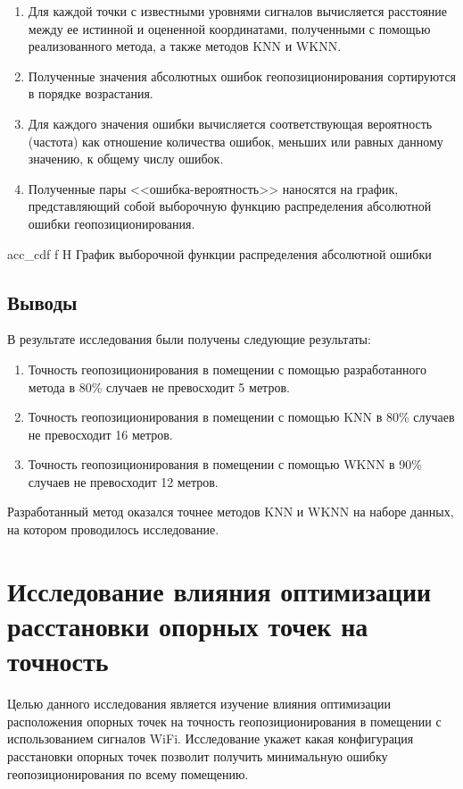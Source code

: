 \begin{enumerate}
    \item Для каждой точки с известными уровнями сигналов вычисляется расстояние между ее истинной и оцененной координатами, полученными с помощью реализованного метода, а также методов KNN и WKNN.
    \item Полученные значения абсолютных ошибок геопозиционирования сортируются в порядке возрастания.
    \item Для каждого значения ошибки вычисляется соответствующая вероятность (частота) как отношение количества ошибок, меньших или равных данному значению, к общему числу ошибок.
    \item Полученные пары <<ошибка-вероятность>> наносятся на график, представляющий собой выборочную функцию распределения абсолютной ошибки геопозиционирования.
\end{enumerate}

    {acc_cdf}
    {f}
    {H}
    {\linewidth}
    {График выборочной функции распределения абсолютной ошибки}

\subsection{Выводы}

В результате исследования были получены следующие результаты:

\begin{enumerate}
    \item Точность геопозиционирования в помещении с помощью разработанного метода в 80\% случаев не превосходит 5 метров.
    \item Точность геопозиционирования в помещении с помощью KNN в 80\% случаев не превосходит 16 метров.
    \item Точность геопозиционирования в помещении с помощью WKNN в 90\% случаев не превосходит 12 метров.
\end{enumerate}

Разработанный метод оказался точнее методов KNN и WKNN на наборе данных, на котором проводилось исследование.

\clearpage

\section{Исследование влияния оптимизации расстановки опорных точек на точность}

Целью данного исследования является изучение влияния оптимизации расположения опорных точек на точность геопозиционирования в помещении с использованием сигналов WiFi. Исследование укажет какая конфигурация расстановки опорных точек позволит получить минимальную ошибку геопозиционирования по всему помещению.

